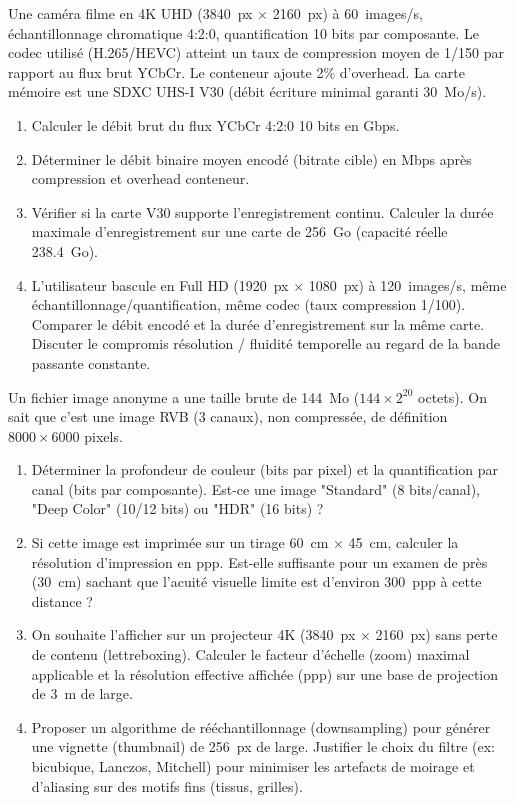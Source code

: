 \documentclass[11pt]{article}
\begin{document}
\begin{exercice}
Une caméra filme en 4K UHD (\SI{3840}{px} $\times$ \SI{2160}{px}) à \SI{60}{images/s}, échantillonnage chromatique 4:2:0, quantification 10 bits par composante. Le codec utilisé (H.265/HEVC) atteint un taux de compression moyen de 1/150 par rapport au flux brut YCbCr. Le conteneur ajoute 2\% d'overhead. La carte mémoire est une SDXC UHS-I V30 (débit écriture minimal garanti \SI{30}{Mo/s}).

\begin{enumerate}
    \item Calculer le débit brut du flux YCbCr 4:2:0 10 bits en Gbps.
    \item Déterminer le débit binaire moyen encodé (bitrate cible) en Mbps après compression et overhead conteneur.
    \item Vérifier si la carte V30 supporte l'enregistrement continu. Calculer la durée maximale d'enregistrement sur une carte de \SI{256}{Go} (capacité réelle \SI{238,4}{Go}).
    \item L'utilisateur bascule en Full HD (\SI{1920}{px} $\times$ \SI{1080}{px}) à \SI{120}{images/s}, même échantillonnage/quantification, même codec (taux compression 1/100). Comparer le débit encodé et la durée d'enregistrement sur la même carte. Discuter le compromis résolution / fluidité temporelle au regard de la bande passante constante.
\end{enumerate}
\end{exercice}

\begin{exercice}
Un fichier image anonyme a une taille brute de \SI{144}{Mo} ($144 \times 2^{20}$ octets). On sait que c'est une image RVB (3 canaux), non compressée, de définition $8000 \times 6000$ pixels.

\begin{enumerate}
    \item Déterminer la profondeur de couleur (bits par pixel) et la quantification par canal (bits par composante). Est-ce une image "Standard" (8 bits/canal), "Deep Color" (10/12 bits) ou "HDR" (16 bits) ?
    \item Si cette image est imprimée sur un tirage \SI{60}{cm} $\times$ \SI{45}{cm}, calculer la résolution d'impression en ppp. Est-elle suffisante pour un examen de près (\SI{30}{cm}) sachant que l'acuité visuelle limite est d'environ \SI{300}{ppp} à cette distance ?
    \item On souhaite l'afficher sur un projecteur 4K (\SI{3840}{px} $\times$ \SI{2160}{px}) sans perte de contenu (lettreboxing). Calculer le facteur d'échelle (zoom) maximal applicable et la résolution effective affichée (ppp) sur une base de projection de \SI{3}{m} de large.
    \item Proposer un algorithme de rééchantillonnage (downsampling) pour générer une vignette (thumbnail) de \SI{256}{px} de large. Justifier le choix du filtre (ex: bicubique, Lanczos, Mitchell) pour minimiser les artefacts de moirage et d'aliasing sur des motifs fins (tissus, grilles).
\end{enumerate}
\end{exercice}
\end{document}
